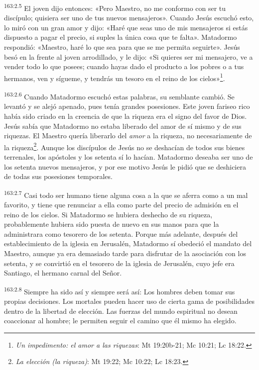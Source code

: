 \par 
\textsuperscript{163:2.5} El joven dijo entonces: «Pero Maestro, no me conformo con ser tu discípulo; quisiera ser uno de tus nuevos mensajeros». Cuando Jesús escuchó esto, lo miró con un gran amor y dijo: «Haré que seas uno de mis mensajeros si estás dispuesto a pagar el precio, si suples la única cosa que te falta». Matadormo respondió: «Maestro, haré lo que sea para que se me permita seguirte». Jesús besó en la frente al joven arrodillado, y le dijo: «Si quieres ser mi mensajero, ve a vender todo lo que posees; cuando hayas dado el producto a los pobres o a tus hermanos, ven y sígueme, y tendrás un tesoro en el reino de los cielos»\footnote{\textit{Un impedimento: el amor a las riquezas}: Mt 19:20b-21; Mc 10:21; Lc 18:22.}.

\par 
\textsuperscript{163:2.6} Cuando Matadormo escuchó estas palabras, su semblante cambió. Se levantó y se alejó apenado, pues tenía grandes posesiones. Este joven fariseo rico había sido criado en la creencia de que la riqueza era el signo del favor de Dios. Jesús sabía que Matadormo no estaba liberado del amor de sí mismo y de sus riquezas. El Maestro quería liberarlo del \textit{amor} a la riqueza, no necesariamente de la riqueza\footnote{\textit{La elección (la riqueza)}: Mt 19:22; Mc 10:22; Lc 18:23.}. Aunque los discípulos de Jesús no se deshacían de todos sus bienes terrenales, los apóstoles y los setenta sí lo hacían. Matadormo deseaba ser uno de los setenta nuevos mensajeros, y por ese motivo Jesús le pidió que se deshiciera de todas sus posesiones temporales.

\par 
\textsuperscript{163:2.7} Casi todo ser humano tiene alguna cosa a la que se aferra como a un mal favorito, y tiene que renunciar a ella como parte del precio de admisión en el reino de los cielos. Si Matadormo se hubiera deshecho de su riqueza, probablemente hubiera sido puesta de nuevo en sus manos para que la administrara como tesorero de los setenta. Porque más adelante, después del establecimiento de la iglesia en Jerusalén, Matadormo sí obedeció el mandato del Maestro, aunque ya era demasiado tarde para disfrutar de la asociación con los setenta, y se convirtió en el tesorero de la iglesia de Jerusalén, cuyo jefe era Santiago, el hermano carnal del Señor.

\par 
\textsuperscript{163:2.8} Siempre ha sido así y siempre será así: Los hombres deben tomar sus propias decisiones. Los mortales pueden hacer uso de cierta gama de posibilidades dentro de la libertad de elección. Las fuerzas del mundo espiritual no desean coaccionar al hombre; le permiten seguir el camino que él mismo ha elegido.

